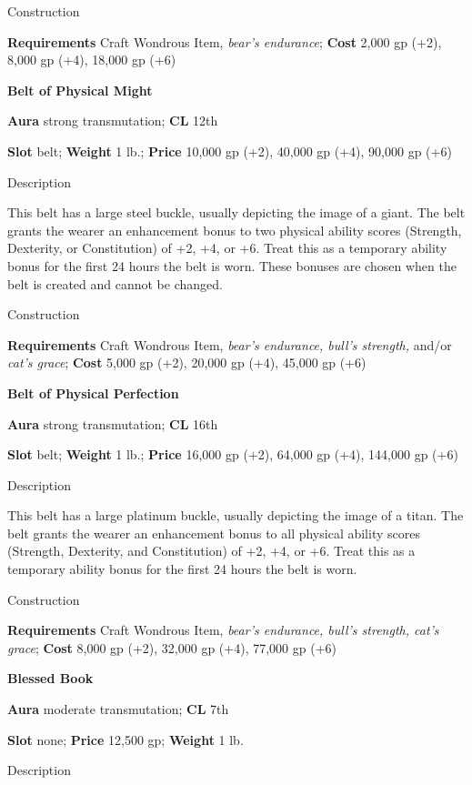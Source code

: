 Construction
				
\textbf{Requirements }Craft Wondrous Item, \textit{bear's endurance}; \textbf{Cost} 2,000 gp (+2), 8,000 gp (+4), 18,000 gp (+6)
				
\textbf{Belt of Physical Might}
				
\textbf{Aura} strong transmutation; \textbf{CL} 12th
				
\textbf{Slot }belt; \textbf{Weight} 1 lb.; \textbf{Price} 10,000 gp (+2), 40,000 gp (+4), 90,000 gp (+6)
				
Description
				
This belt has a large steel buckle, usually depicting the image of a giant. The belt grants the wearer an enhancement bonus to two physical ability scores (Strength, Dexterity, or Constitution) of +2, +4, or +6. Treat this as a temporary ability bonus for the first 24 hours the belt is worn. These bonuses are chosen when the belt is created and cannot be changed.
				
Construction
				
\textbf{Requirements }Craft Wondrous Item, \textit{bear's endurance, bull's strength, }and/or\textit{ cat's grace}; \textbf{Cost} 5,000 gp (+2), 20,000 gp (+4), 45,000 gp (+6)
				
\textbf{Belt of Physical Perfection}
				
\textbf{Aura} strong transmutation; \textbf{CL} 16th
				
\textbf{Slot }belt; \textbf{Weight} 1 lb.; \textbf{Price} 16,000 gp (+2), 64,000 gp (+4), 144,000 gp (+6)
				
Description
				
This belt has a large platinum buckle, usually depicting the image of a titan. The belt grants the wearer an enhancement bonus to all physical ability scores (Strength, Dexterity, and Constitution) of +2, +4, or +6. Treat this as a temporary ability bonus for the first 24 hours the belt is worn.
				
Construction
				
\textbf{Requirements }Craft Wondrous Item, \textit{bear's endurance, bull's strength, cat's grace}; \textbf{Cost} 8,000 gp (+2), 32,000 gp (+4), 77,000 gp (+6)
				
\textbf{Blessed Book}
				
\textbf{Aura} moderate transmutation;\textbf{ CL }7th
				
\textbf{Slot} none; \textbf{Price} 12,500 gp; \textbf{Weight} 1 lb.
				
Description
				
